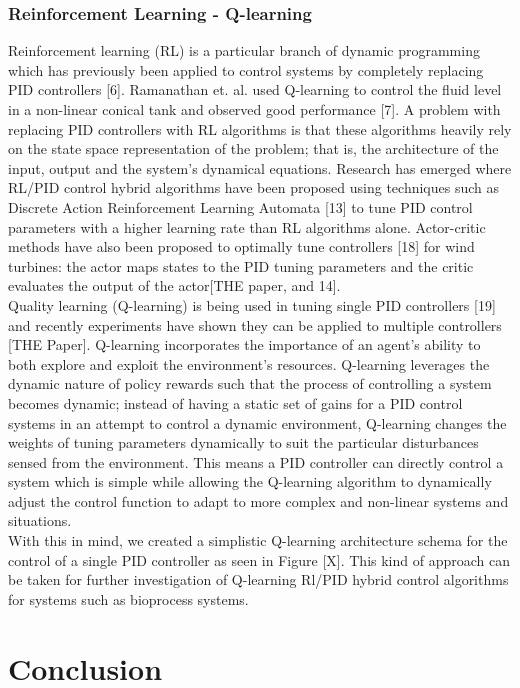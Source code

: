 \documentclass[conference]{IEEEtran}
\theoremstyle{definition}
\begin{document}
\subsubsection{Reinforcement Learning - Q-learning}
Reinforcement learning (RL) is a particular branch of dynamic programming which has previously been applied to control systems by completely replacing PID controllers [6]. Ramanathan et. al. used Q-learning to control the fluid level in a non-linear conical tank and observed good performance [7]. A problem with replacing PID controllers with RL algorithms is that these algorithms heavily rely on the state space representation of the problem; that is, the architecture of the input, output and the system's dynamical equations. 
Research has emerged where RL/PID control hybrid algorithms have been proposed using techniques such as Discrete Action Reinforcement Learning Automata [13] to tune PID control parameters with a higher learning rate than RL algorithms alone. Actor-critic methods have also been proposed to optimally tune controllers [18] for wind turbines: the actor maps states to the PID tuning parameters and the critic evaluates the output of the actor[THE paper, and 14]. \\
Quality learning (Q-learning) is being used in tuning single PID controllers [19] and recently experiments have shown they can be applied to multiple controllers [THE Paper]. Q-learning incorporates the importance of an agent's ability to both explore and exploit the environment's resources. Q-learning leverages the dynamic nature of policy rewards such that the process of controlling a system becomes dynamic; instead of having a static set of gains for a PID control systems in an attempt to control a dynamic environment, Q-learning changes the weights of tuning parameters dynamically to suit the particular disturbances sensed from the environment. This means a PID controller can directly control a system which is simple while allowing the Q-learning algorithm to dynamically adjust the control function to adapt to more complex and non-linear systems and situations. \\
With this in mind, we created a simplistic Q-learning architecture schema for the control of a single PID controller as seen in Figure [X]. This kind of approach can be taken for further investigation of Q-learning Rl/PID hybrid control algorithms for systems such as bioprocess systems.

\section{Conclusion}
\end{document}
